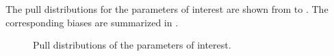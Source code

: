 The pull distributions for the parameters of interest are shown from  to .
The corresponding biases are summarized in .

\begin{figure}[!t]
  \centering
  \begin{subfigure}{0.5\textwidth}
    \raggedright
    \scalebox{0.56}{}
    \caption{}
    \label{pull_f0}
  \end{subfigure}%
  \hfill%
  \begin{subfigure}{0.5\textwidth}
    \raggedleft
    \scalebox{0.56}{}
    \caption{}
    \label{pull_fpar}
  \end{subfigure}
  \begin{subfigure}{0.5\textwidth}
    \raggedright
    \scalebox{0.56}{}
    \caption{}
    \label{pull_AparPhase}
  \end{subfigure}%
  \hfill%
  \begin{subfigure}{0.5\textwidth}
    \raggedleft
    \scalebox{0.56}{}
    \caption{}
    \label{pull_AperpPhase}
  \end{subfigure}
\caption{Pull distributions of the \pwave parameters of interest.}
\label{pull_pwave}
\end{figure}


